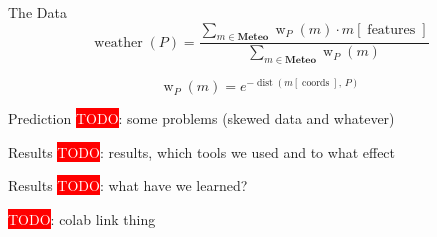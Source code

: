 \documentclass[aspectratio=169,compress,14pt]{beamer}
\newcommand{\TODO}[1]{\colorbox{red}{\textcolor{white}{TODO}}: #1}
\begin{document}
\begin{frame}{The Data}
  \Large
  \begin{equation*}
    \operatorname{weather}(P) =
    \frac{
      \sum\nolimits_{m \in \textbf{Meteo}} \operatorname{w}_P(m) \cdot m[\operatorname{features}]
    }{
      \sum\nolimits_{m \in \textbf{Meteo}}\operatorname{w}_P(m)
    }
  \end{equation*}
  \bigskip\pause

  \begin{equation*}
    \operatorname{w}_P(m) = e^{-\operatorname{dist}(m[\operatorname{coords}],\, P)}
  \end{equation*}
\end{frame}

\begin{frame}{Prediction}
  \TODO{some problems (skewed data and whatever)}
\end{frame}

\begin{frame}{Results}
  \TODO{results, which tools we used and to what effect}
\end{frame}

\begin{frame}{Results}
  \TODO{what have we learned?}
\end{frame}

\begin{frame}{}
  \TODO{colab link thing}
\end{frame}
\end{document}
